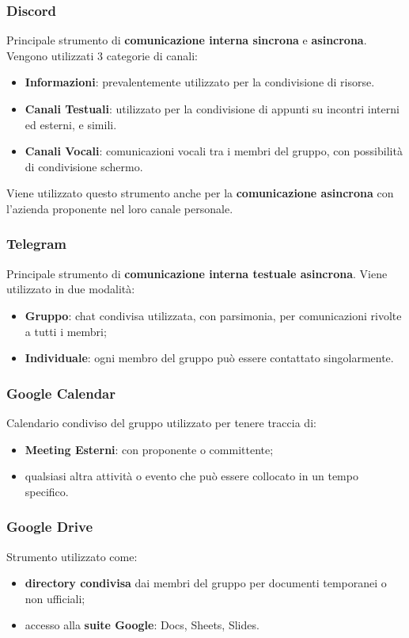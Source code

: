\subsubsection{Discord}
Principale strumento di \textbf{comunicazione interna sincrona} e \textbf{asincrona}. Vengono utilizzati 3 categorie di canali:
\begin{itemize}
  \item \textbf{Informazioni}: prevalentemente utilizzato per la condivisione di risorse.
  \item \textbf{Canali Testuali}: utilizzato per la condivisione di appunti su incontri interni ed esterni, e simili.
  \item \textbf{Canali Vocali}: comunicazioni vocali tra i membri del gruppo, con possibilità di condivisione schermo.
\end{itemize}
\medskip
Viene utilizzato questo strumento anche per la \textbf{comunicazione asincrona} con l'azienda proponente nel loro canale personale.

\subsubsection{Telegram}
Principale strumento di \textbf{comunicazione interna testuale asincrona}. Viene utilizzato in due modalità:
\begin{itemize}
  \item \textbf{Gruppo}: chat condivisa utilizzata, con parsimonia, per comunicazioni rivolte a tutti i membri;
  \item \textbf{Individuale}: ogni membro del gruppo può essere contattato singolarmente.
\end{itemize}

\subsubsection{Google Calendar}
Calendario condiviso del gruppo utilizzato per tenere traccia di:
\begin{itemize}
  \item \textbf{Meeting Esterni}: con proponente o committente;
  \item qualsiasi altra attività o evento che può essere collocato in un tempo specifico.
\end{itemize}

\subsubsection{Google Drive}
Strumento utilizzato come:
\begin{itemize}
  \item \textbf{directory condivisa} dai membri del gruppo per documenti temporanei o non ufficiali;
  \item accesso alla \textbf{suite Google}: Docs, Sheets, Slides.
\end{itemize}

